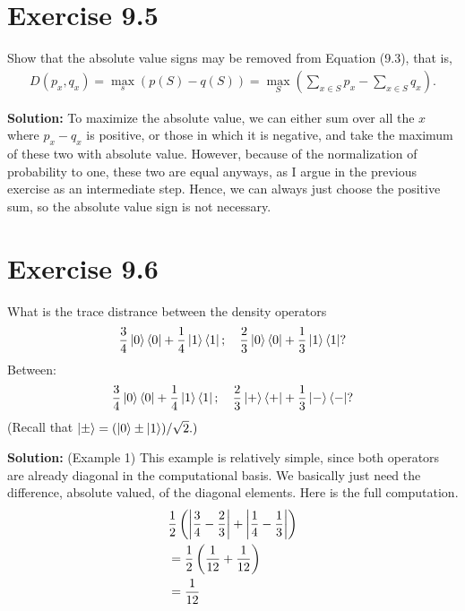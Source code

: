 \documentclass{book}
\begin{document}
\section*{Exercise 9.5}
    Show that the absolute value signs may be removed from Equation (9.3), that is,
    \begin{align}
        D(p_x, q_x) = \max_s (p(S)-q(S)) = \max_S \left(\sum_{x\in S} p_x -\sum_{x\in S} q_x\right).
    \end{align}
    
    \textbf{Solution:} To maximize the absolute value, we can either sum over all the $x$ where $p_x-q_x$ is positive, or those in which it is negative, and take the maximum of these two with absolute value. However, because of the normalization of probability to one, these two are equal anyways, as I argue in the previous exercise as an intermediate step. Hence, we can always just choose the positive sum, so the absolute value sign is not necessary. 
    
\section*{Exercise 9.6}
    What is the trace distrance between the density operators
    \begin{align}
        \frac{3}{4}\ket{0}\bra{0}+\frac{1}{4}\ket{1}\bra{1};\quad \frac{2}{3}\ket{0}\bra{0}+\frac{1}{3}\ket{1}\bra{1}?
    \end{align}
    Between:
    \begin{align}
        \frac{3}{4}\ket{0}\bra{0}+\frac{1}{4}\ket{1}\bra{1};\quad \frac{2}{3}\ket{+}\bra{+}+\frac{1}{3}\ket{-}\bra{-}?
    \end{align}
    (Recall that $\ket{\pm} = (\ket{0}\pm\ket{1})/\sqrt{2}.)$
    
    \textbf{Solution:} (Example 1) This example is relatively simple, since both operators are already diagonal in the computational basis. We basically just need the difference, absolute valued, of the diagonal elements. Here is the full computation.
    \begin{align}
    \begin{aligned}
         &\frac{1}{2}\left(\abs{\frac{3}{4}-\frac{2}{3}}+\abs{\frac{1}{4}-\frac{1}{3}}\right) \\
         &= \frac{1}{2}\left(\frac{1}{12}+\frac{1}{12}\right) \\
         &= \frac{1}{12}
    \end{aligned}
    \end{align}
    
\end{document}
